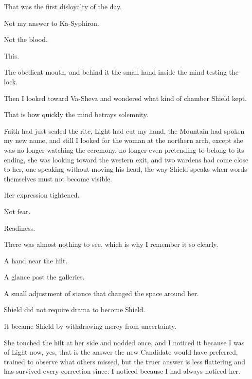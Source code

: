 That was the first disloyalty of the day.\par

Not my answer to Ka-Syphiron.\par

Not the blood.\par

This.\par

The obedient mouth, and behind it the small hand inside the mind testing the lock.\par

Then I looked toward Va-Sheva and wondered what kind of chamber Shield kept.\par

That is how quickly the mind betrays solemnity.\par

Faith had just sealed the rite, Light had cut my hand, the Mountain had spoken my new name, and still I looked for the woman at the northern arch, except she was no longer watching the ceremony, no longer even pretending to belong to its ending, she was looking toward the western exit, and two wardens had come close to her, one speaking without moving his head, the way Shield speaks when words themselves must not become visible.\par

Her expression tightened.\par

Not fear.\par

Readiness.\par

There was almost nothing to see, which is why I remember it so clearly.\par

A hand near the hilt.\par

A glance past the galleries.\par

A small adjustment of stance that changed the space around her.\par

Shield did not require drama to become Shield.\par

It became Shield by withdrawing mercy from uncertainty.\par

She touched the hilt at her side and nodded once, and I noticed it because I was of Light now, yes, that is the answer the new Candidate would have preferred, trained to observe what others missed, but the truer answer is less flattering and has survived every correction since: I noticed because I had always noticed her.\par

